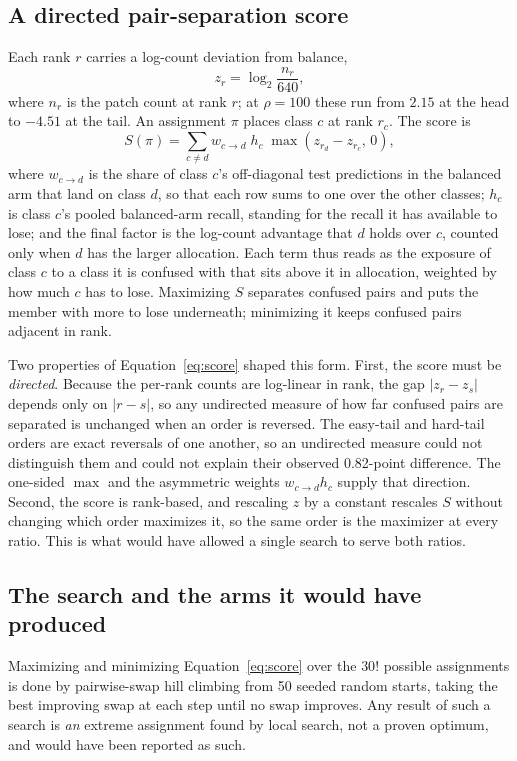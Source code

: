 \documentclass[11pt]{article}
\begin{document}
\subsection{A directed pair-separation score}
\label{sec:score}
Each rank $r$ carries a log-count deviation from balance,
\begin{equation}
  z_r = \log_2 \frac{n_r}{640},
  \label{eq:z}
\end{equation}
\noindent where $n_r$ is the patch count at rank $r$; at $\rho=100$ these run from $2.15$ at the head to $-4.51$ at the tail. An assignment $\pi$ places class $c$ at rank $r_c$. The score is
\begin{equation}
  S(\pi) = \sum_{c \neq d} w_{c \rightarrow d}\; h_c\; \max\!\left(z_{r_d} - z_{r_c},\, 0\right),
  \label{eq:score}
\end{equation}
\noindent where $w_{c \rightarrow d}$ is the share of class $c$'s off-diagonal test predictions in the balanced arm that land on class $d$, so that each row sums to one over the other classes; $h_c$ is class $c$'s pooled balanced-arm recall, standing for the recall it has available to lose; and the final factor is the log-count advantage that $d$ holds over $c$, counted only when $d$ has the larger allocation. Each term thus reads as the exposure of class $c$ to a class it is confused with that sits above it in allocation, weighted by how much $c$ has to lose. Maximizing $S$ separates confused pairs and puts the member with more to lose underneath; minimizing it keeps confused pairs adjacent in rank.

Two properties of Equation~\eqref{eq:score} shaped this form. First, the score must be \emph{directed}. Because the per-rank counts are log-linear in rank, the gap $|z_r - z_s|$ depends only on $|r-s|$, so any undirected measure of how far confused pairs are separated is unchanged when an order is reversed. The easy-tail and hard-tail orders are exact reversals of one another, so an undirected measure could not distinguish them and could not explain their observed 0.82-point difference. The one-sided $\max$ and the asymmetric weights $w_{c \rightarrow d} h_c$ supply that direction. Second, the score is rank-based, and rescaling $z$ by a constant rescales $S$ without changing which order maximizes it, so the same order is the maximizer at every ratio. This is what would have allowed a single search to serve both ratios.

\subsection{The search and the arms it would have produced}
\label{sec:arms}
Maximizing and minimizing Equation~\eqref{eq:score} over the $30!$ possible assignments is done by pairwise-swap hill climbing from 50 seeded random starts, taking the best improving swap at each step until no swap improves. Any result of such a search is \emph{an} extreme assignment found by local search, not a proven optimum, and would have been reported as such.
\end{document}

